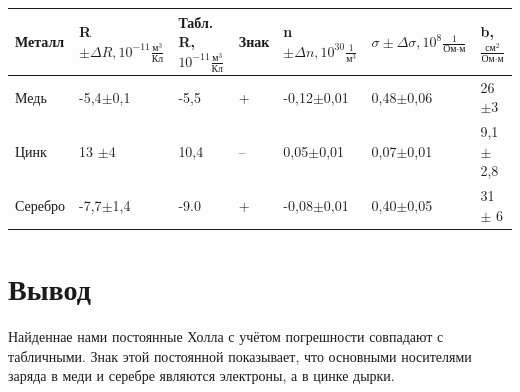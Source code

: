 \documentclass[a4paper,12pt]{article}
\theoremstyle{definition}
\begin{document}
    \begin{table}[h!]
        \begin{tabular}{|l|l|l|l|l|l|l|}
            \hline
            Металл  & R $\pm \Delta R, 10^{-11} \frac{\text{м}^3}{\text{Кл}}$       & Табл. R,  $ 10^{-11} \frac{\text{м}^3}{\text{Кл}}$ & Знак & n$\pm \Delta n, 10^{30}\frac{1}{\text{м}^3}$         & $\sigma \pm \Delta \sigma, 10^{8}\frac{1}{\text{Ом$\cdot$м}}$    & b, $\frac{\text{см}^2}{\text{Ом$\cdot$м}}$   \\ \hline
            Медь    & -5,4$\pm$0,1 & -5,5     & +           & -0,12$\pm$0,01 & 0,48$\pm$0,06 & 26$\pm$3 \\ \hline
            Цинк    & 13 $\pm$4  & 10,4      & --           & 0,05$\pm$0,01 & 0,07$\pm$0,01 & 9,1$\pm$2,8 \\ \hline
            Серебро & -7,7$\pm$1,4 & -9.0       & +           &  -0,08$\pm$0,01         &    0,40$\pm$0,05       &  31  $\pm$ 6  \\ \hline
        \end{tabular}
    \end{table}

    
    \section{Вывод}
    Найденнае нами постоянные Холла с учётом погрешности совпадают с табличными. Знак этой постоянной показывает, что основными носителями заряда в меди и серебре являются электроны, а в цинке дырки.
\end{document}
